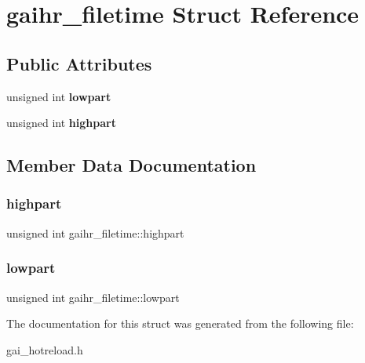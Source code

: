 \hypertarget{structgaihr__filetime}{}\section{gaihr\+\_\+filetime Struct Reference}
\label{structgaihr__filetime}
\subsection*{Public Attributes}
\begin{DoxyCompactItemize}
\item 
\mbox{\label{structgaihr__filetime_ac97443b53714d1ed266459ef0158c278}} 
unsigned int {\bfseries lowpart}
\item 
\mbox{\label{structgaihr__filetime_aa35cb3a699771f27e62ecff738665169}} 
unsigned int {\bfseries highpart}
\end{DoxyCompactItemize}


\subsection{Member Data Documentation}
\mbox{\label{structgaihr__filetime_aa35cb3a699771f27e62ecff738665169}} 
\subsubsection{\texorpdfstring{highpart}{highpart}}
{\footnotesize\ttfamily unsigned int gaihr\+\_\+filetime\+::highpart}

\mbox{\label{structgaihr__filetime_ac97443b53714d1ed266459ef0158c278}} 
\subsubsection{\texorpdfstring{lowpart}{lowpart}}
{\footnotesize\ttfamily unsigned int gaihr\+\_\+filetime\+::lowpart}



The documentation for this struct was generated from the following file\+:\begin{DoxyCompactItemize}
\item 
gai\+\_\+hotreload.\+h\end{DoxyCompactItemize}
